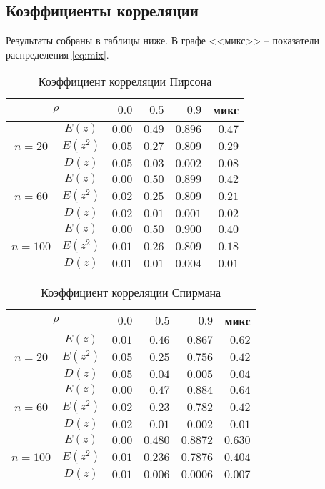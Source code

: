 \documentclass[main.tex]{subfiles}
\begin{document}
\subsection{Коэффициенты корреляции}
Результаты собраны в таблицы ниже. В графе <<микс>> -- показатели распределения \eqref{eq:mix}.
\begin{table}[H]
	\centering
	\caption{Коэффициент корреляции Пирсона}
\begin{tabular}{cc*4r}
	\toprule
	\multicolumn{2}{c}{$\rho$} & $0.0$ & $0.5$ & $0.9$ & микс \\
	\midrule
	\multirow{3}{*}{ $n=20$ }
	& $E(z)$   & $0.00$  & $0.49$ & $0.896$ & $0.47$ \\
	& $E(z^2)$ & $0.05$  & $0.27$ & $0.809$ & $0.29$ \\
	& $D(z)$   & $0.05$  & $0.03$ & $0.002$ & $0.08$ \\
	\multirow{3}{*}{ $n=60$ }
	& $E(z)$   & $0.00$  & $0.50$ & $0.899$ & $0.42$ \\
	& $E(z^2)$ & $0.02$  & $0.25$ & $0.809$ & $0.21$ \\
	& $D(z)$   & $0.02$  & $0.01$ & $0.001$ & $0.02$ \\
	\multirow{3}{*}{ $n=100$ }
	& $E(z)$   & $0.00$  & $0.50$ & $0.900$ & $0.40$ \\
	& $E(z^2)$ & $0.01$  & $0.26$ & $0.809$ & $0.18$ \\
	& $D(z)$   & $0.01$  & $0.01$ & $0.004$ & $0.01$ \\
	\bottomrule
\end{tabular}
	\label{table:pearson}
\end{table}

\begin{table}[H]
	\centering
	\caption{Коэффициент корреляции Спирмана}
	\begin{tabular}{cc*4r}
		\toprule
		\multicolumn{2}{c}{$\rho$} & $0.0$ & $0.5$ & $0.9$ & микс \\
		\midrule
		\multirow{3}{*}{ $n=20$ }
		& $E(z)$   & $0.01$  & $0.46$ & $0.867$ & $0.62$ \\
		& $E(z^2)$ & $0.05$  & $0.25$ & $0.756$ & $0.42$ \\
		& $D(z)$   & $0.05$  & $0.04$ & $0.005$ & $0.04$ \\
		\multirow{3}{*}{ $n=60$ }
		& $E(z)$   & $0.00$  & $0.47$ & $0.884$ & $0.64$ \\
		& $E(z^2)$ & $0.02$  & $0.23$ & $0.782$ & $0.42$ \\
		& $D(z)$   & $0.02$  & $0.01$ & $0.002$ & $0.01$ \\
		\multirow{3}{*}{ $n=100$ }
		& $E(z)$   & $0.00$  & $0.480$ & $0.8872$ & $0.630$ \\
		& $E(z^2)$ & $0.01$  & $0.236$ & $0.7876$ & $0.404$ \\
		& $D(z)$   & $0.01$  & $0.006$ & $0.0006$ & $0.007$ \\
		\bottomrule
	\end{tabular}
	\label{table:spearman}
\end{table}
\end{document}
